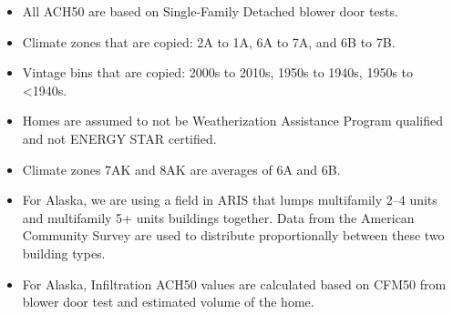 \begin{itemize}
 
\item
  All ACH50 are based on Single-Family Detached blower door tests.
\item
  Climate zones that are copied: 2A to 1A, 6A to 7A, and 6B to 7B.
\item
  Vintage bins that are copied: 2000s to 2010s, 1950s to 1940s, 1950s to
  \textless1940s.
\item
  Homes are assumed to not be Weatherization Assistance Program
  qualified and not ENERGY STAR certified.
\item
  Climate zones 7AK and 8AK are averages of 6A and 6B.
\item
  For Alaska, we are using a field in ARIS that lumps multifamily 2--4
  units and multifamily 5+ units buildings together. Data from the
  American Community Survey are used to distribute proportionally between these two
  building types.
\item
  For Alaska, Infiltration ACH50 values are calculated based on CFM50
  from blower door test and estimated volume of the home.
\end{itemize}










